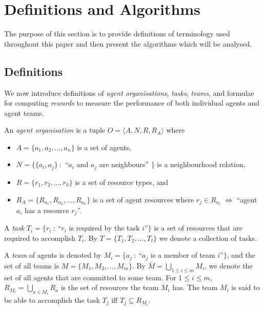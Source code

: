 \documentclass{llncs}
\begin{document}
\section{Definitions and Algorithms}

The purpose of this section is to provide definitions of terminology
used throughout this paper and then present the algorithms which will be analysed.

\subsection{Definitions}

We now introduce definitions of \emph{agent organisations}, \emph{tasks}, \emph{teams}, and formulae for computing \emph{rewards} to measure the performance of both individual agents and agent teams.

\begin{definition}
An \emph{agent organisation} is a tuple $O=\langle A, N, R, R_A  \rangle$ where
\noindent
\begin{itemize}
\item $A= \{ a_1,a_2,...,a_n \} $ is a set of agents,
\item $N=\{\{a_i,a_j \}\ :$ ``$a_i$ and $a_j$ are neighbours'' $\}$ is a neighbourhood relation,
\item $R=\{r_1,r_2,\dots,r_k\}$ is a set of resource types, and
\item $R_A=\{R_{a_1}, R_{a_2}, \dots, R_{a_n}\}$ is a set of agent resources where $r_j \in R_{a_i} $ $\iff$ ``agent $a_i$ has a resource $r_j$''.
\end{itemize}
\end{definition}

\begin{definition}[Task]
A \emph{task} $T_i=\{r_i\ :\ $``$r_i$ is required by the task $i$''$\}$ is a set of resources that are required to accomplish $T_i$. By $T=\{T_1, T_2,\dots, T_t\}$ we denote a collection of tasks.
\end{definition}

\begin{definition}[Team]
A \emph{team} of agents is denoted by $M_i=\{a_j\ :\ $``$a_j$ is a member of team $i$''$\}$, and the set of all teams is $M=\{M_1, M_2,\dots , M_m\}$. By $\bar{M} = \bigcup_{1\leq i\leq m} M_i$, we denote the set of all agents that are committed to some team. For $1\leq i\leq m$, $R_{M_i}=\bigcup_{a \in M_i}R_{a}$ is the set of resources the team $M_i$ has. The team $M_i$ is said to be able to accomplish the task $T_j$ iff $T_j \subseteq R_{M_i}$.
\end{definition}
\end{document}
